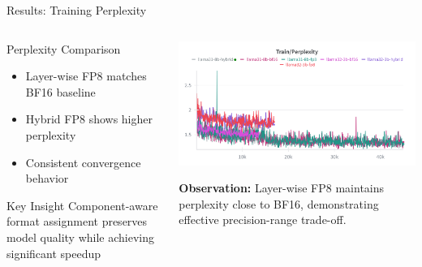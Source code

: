 \begin{frame}{Results: Training Perplexity}

\begin{columns}[c]
\begin{column}{0.48\textwidth}
    \begin{block}{Perplexity Comparison}
    \small
    \begin{itemize}
        \item Layer-wise FP8 matches BF16 baseline
        \item Hybrid FP8 shows higher perplexity
        \item Consistent convergence behavior
    \end{itemize}
    \end{block}

    \vspace{0.3cm}

    \begin{alertblock}{Key Insight}
    \small
    Component-aware format assignment preserves model quality while achieving significant speedup
    \end{alertblock}
\end{column}

\begin{column}{0.50\textwidth}
    \centering
    \includegraphics[width=\textwidth]{figures/train_perplexity.png}

    \vspace{0.3cm}

    \small
    \textbf{Observation:} Layer-wise FP8 maintains perplexity close to BF16, demonstrating effective precision-range trade-off.
\end{column}
\end{columns}

\end{frame}
